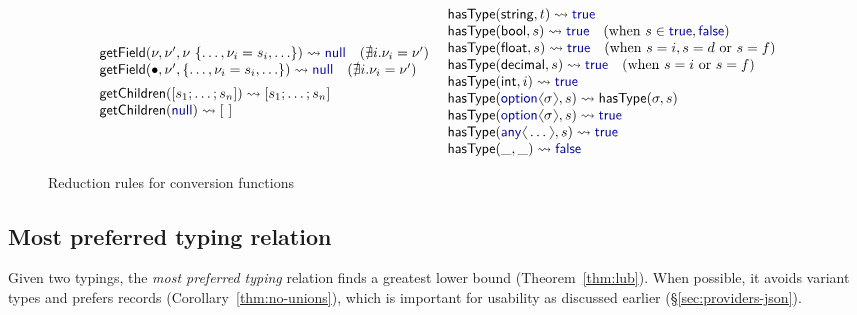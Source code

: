 \documentclass[10pt,preprint,blind,clearpagebib]{sigplanconf}
\newcommand{\langl}{\begin{picture}(4.5,7)
\put(1.1,2.5){\rotatebox{60}{\line(1,0){5.5}}}
\put(1.1,2.5){\rotatebox{300}{\line(1,0){5.5}}}
\end{picture}}
\newcommand{\rangl}{\begin{picture}(4.5,7)
\put(.9,2.5){\rotatebox{120}{\line(1,0){5.5}}}
\put(.9,2.5){\rotatebox{240}{\line(1,0){5.5}}}
\end{picture}}
\newcommand{\kvd}[1]{\textnormal{\textcolor{kvdclr}{\sffamily #1}}}
\newcommand{\ident}[1]{\textnormal{\sffamily #1}}
\newcommand{\reduce}{\rightsquigarrow}
\begin{document}
\begin{figure}
\begin{equation*}
\begin{array}{l}
\ident{getField}(\nu,\nu', \nu~\{\ldots, \nu_i=s_i, \ldots\}) \reduce \kvd{null}\quad(\nexists i.\nu_i=\nu' )\\
\ident{getField}(\bullet, \nu', \{\ldots, \nu_i=s_i, \ldots\}) \reduce \kvd{null}\quad(\nexists i.\nu_i=\nu' )
\\[0.5em]
\ident{getChildren}([s_1; \ldots; s_n]) \reduce [s_1; \ldots; s_n]  \\  
\ident{getChildren}(\kvd{null}) \reduce [~] 
\end{array}
~
\begin{array}{l}
\ident{hasType}(\ident{string}, t) \reduce \kvd{true} \\
\ident{hasType}(\ident{bool}, s) \reduce \kvd{true} \quad(\textnormal{when}~s\in{\kvd{true},\kvd{false}} )\\
\ident{hasType}(\ident{float}, s) \reduce \kvd{true} \quad(\textnormal{when}~s=i, s=d ~\textnormal{or}~ s=f) \\
\ident{hasType}(\ident{decimal}, s) \reduce \kvd{true} \quad(\textnormal{when}~s=i ~\textnormal{or}~ s=f) \\
\ident{hasType}(\ident{int}, i) \reduce \kvd{true}\\
\ident{hasType}(\kvd{option}\langl\sigma\rangl, s) \reduce \ident{hasType}(\sigma,s) \\
\ident{hasType}(\kvd{option}\langl\sigma\rangl, s) \reduce \kvd{true} \\
\ident{hasType}(\kvd{any}\langl\ldots\rangl, s) \reduce \kvd{true} \\
\ident{hasType}(\_, \_) \reduce \kvd{false} \\
\end{array}
\end{equation*}

\caption{Reduction rules for conversion functions}
\label{fig:op-conversions}
\vspace{-0.5em}
\end{figure}


\subsection{Most preferred typing relation}
\label{sec:inference-commonsuper}

Given two typings, the \emph{most preferred typing} relation finds a greatest lower bound
(Theorem~\ref{thm:lub}). When possible, it avoids variant types and prefers records 
(Corollary~\ref{thm:no-unions}), which is important for usability as discussed earlier
(\S\ref{sec:providers-json}). 
\end{document}
